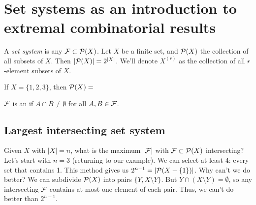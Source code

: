 
\section{Set systems as an introduction to extremal combinatorial results}
 A \emph{set system} is any $\F\subset \P(X)$.
Let $X$ be a finite set, and $\P(X)$ the collection of all subsets of $X$.  Then $|\P(X)|  = 2^{|X|}$. We'll denote $X^{(r)}$ as the collection of all $r$-element subsets of $X$.
\begin{example}
If $X = \{1,2,3\}$, then $\P(X)=$ 
\begin{center}
\end{center}
\end{example}


\begin{definition}
$\F$ is an  if $A\cap B\neq\emptyset$ for all $A,B\in \F$.
\end{definition}

\subsection*{Largest intersecting set system}
Given $X$ with $|X| = n$, what is the maximum $|\F|$ with $\F\subset \P(X)$ intersecting? Let's start with $n=3$ (returning to our example). We can select at least 4: every set that contains 1. This method gives us $2^{n-1}= |\P(X \setminus\{1\})|$. Why can't we do better? We can subdivide $\P(X)$ into pairs $\{Y, X\setminus Y\}$. But $Y\cap (X\setminus Y) = \emptyset$, so any intersecting $\F$ contains at most one element of each pair. Thus, we can't do better than $2^{n-1}$.

